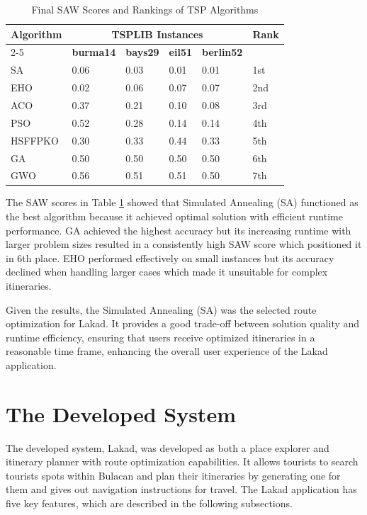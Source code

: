 \begin{table}[H]
	\centering
	\singlespacing
	\caption{Final SAW Scores and Rankings of TSP Algorithms}
	\label{tab:rank} \renewcommand{\arraystretch}{1.2}
	\begin{tabularx}{\linewidth}{XXXXXX}
		\toprule
        \multirow{2}{*}{\textbf{Algorithm}} & \multicolumn{4}{c}{\textbf{TSPLIB Instances}} & \multirow{2}{*}{\textbf{Rank}} \\
        \cmidrule(lr){2-5}
         & \textbf{burma14} & \textbf{bays29} & \textbf{eil51} & \textbf{berlin52} &  \\
		\midrule
        SA      & 0.06  & 0.03  & 0.01  & 0.01 & 1st \\
        EHO     & 0.02  & 0.06  & 0.07  & 0.07 & 2nd \\
        ACO     & 0.37  & 0.21  & 0.10  & 0.08 & 3rd \\
        PSO     & 0.52  & 0.28  & 0.14  & 0.14 & 4th \\
        HSFFPKO & 0.30  & 0.33  & 0.44  & 0.33 & 5th \\
        GA      & 0.50  & 0.50  & 0.50  & 0.50 & 6th \\
        GWO     & 0.56  & 0.51  & 0.51  & 0.50 & 7th \\
		\bottomrule
	\end{tabularx}
\end{table}

The SAW scores in Table \ref{tab:rank} showed that Simulated Annealing (SA) functioned as the best algorithm because it achieved optimal solution with efficient runtime performance. GA achieved the highest accuracy but its increasing runtime with larger problem sizes resulted in a consistently high SAW score which positioned it in 6th place. EHO performed effectively on small instances but its accuracy declined when handling larger cases which made it unsuitable for complex itineraries.

Given the results, the Simulated Annealing (SA) was the selected route optimization for Lakad. It provides a good trade-off between solution quality and runtime efficiency, ensuring that users receive optimized itineraries in a reasonable time frame, enhancing the overall user experience of the Lakad application.


\section{The Developed System}
The developed system, Lakad, was developed as both a place explorer and itinerary planner with route optimization capabilities. It allows tourists to search tourists spots within Bulacan and plan their itineraries by generating one for them and gives out navigation instructions for travel. The Lakad application has five key features, which are described in the following subsections.

